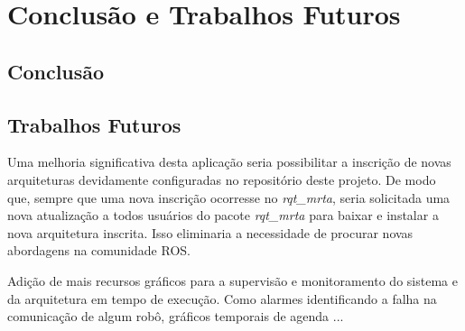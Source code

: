 \chapter[Conclusão e Trabalhos Futuros]{Conclusão e Trabalhos Futuros} \label{cap:conclusao}

    \section{Conclusão}
    
    \section{Trabalhos Futuros}
        Uma melhoria significativa desta aplicação seria possibilitar a inscrição de novas arquiteturas devidamente configuradas no repositório deste projeto. De modo que, sempre que uma nova inscrição ocorresse no \textit{rqt\_mrta}, seria solicitada uma nova atualização a todos usuários do pacote \textit{rqt\_mrta} para baixar e instalar a nova arquitetura inscrita. Isso eliminaria a necessidade de procurar novas abordagens na comunidade ROS.
        
        Adição de mais recursos gráficos para a supervisão e monitoramento do sistema e da arquitetura em tempo de execução. Como alarmes identificando a falha na comunicação de algum robô, gráficos temporais de agenda ...